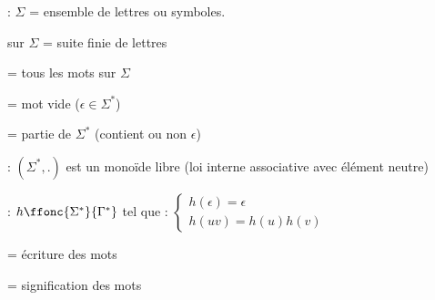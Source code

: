  : $\Sigma$ = ensemble de lettres ou symboles. \\

\par

 sur $\Sigma$ = suite finie de lettres \\

\par

\titre{$\Sigma^*$} = tous les mots sur $\Sigma$ \\

\par

\titre{$\epsilon$} = mot vide ($\epsilon \in \Sigma^*$) \\

\par

 = partie de $\Sigma^*$ (contient ou non $\epsilon$)\\

\par

 : $(\Sigma^*,.)$ est un monoïde libre (loi interne associative avec élément neutre) \\

\par

 : $h\ffonc{\Sigma^*}{\Gamma^*}$ tel que : $\left\{ \begin{array}{l} h(\epsilon) = \epsilon \\ h(uv) = h(u)h(v) \end{array} \right.$\\
\par

 = écriture des mots \\

\par

 = signification des mots 
